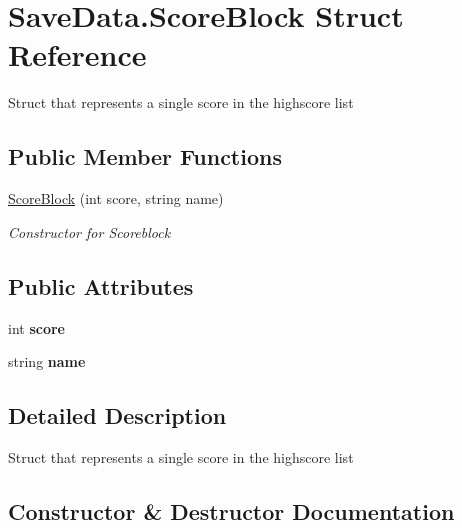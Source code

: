 \hypertarget{struct_save_data_1_1_score_block}{}\section{Save\+Data.\+Score\+Block Struct Reference}
\label{struct_save_data_1_1_score_block}


Struct that represents a single score in the highscore list  


\subsection*{Public Member Functions}
\begin{DoxyCompactItemize}
\item 
\hyperlink{struct_save_data_1_1_score_block_a3ca084139639f3dce178c7d187315acf}{Score\+Block} (int score, string name)
\begin{DoxyCompactList}\small\item\em Constructor for Scoreblock \end{DoxyCompactList}\end{DoxyCompactItemize}
\subsection*{Public Attributes}
\begin{DoxyCompactItemize}
\item 
int {\bfseries score}\hypertarget{struct_save_data_1_1_score_block_a334fa2ff8427ba7af6989ad28aceea03}{}\label{struct_save_data_1_1_score_block_a334fa2ff8427ba7af6989ad28aceea03}

\item 
string {\bfseries name}\hypertarget{struct_save_data_1_1_score_block_abd747ee96d8c50126232fe3d33b12682}{}\label{struct_save_data_1_1_score_block_abd747ee96d8c50126232fe3d33b12682}

\end{DoxyCompactItemize}


\subsection{Detailed Description}
Struct that represents a single score in the highscore list 



\subsection{Constructor \& Destructor Documentation}
